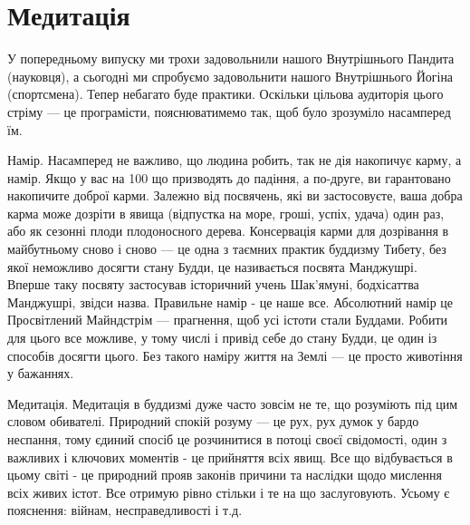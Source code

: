 \section{Медитація}

У попередньому випуску ми трохи задовольнили нашого Внутрішнього Пандита (науковця),
а сьогодні ми спробуємо задовольнити нашого Внутрішнього Йогіна (спортсмена).
Тепер небагато буде практики. Оскільки цільова аудиторія цього стріму ---
це програмісти, пояснюватимемо так, щоб було зрозуміло насамперед їм.

Намір. Насамперед не важливо, що людина робить, так не дія накопичує карму, а намір.
Якщо у вас на 100%
що призводять до падіння, а по-друге, ви гарантовано накопичите доброї карми.
Залежно від посвячень, які ви застосовуєте, ваша добра карма може дозріти в
явища (відпустка на море, гроші, успіх, удача) один раз, або як сезонні плоди
плодоносного дерева. Консервація карми для дозрівання в майбутньому сново і сново ---
це одна з таємних практик буддизму Тибету, без якої неможливо досягти стану Будди,
це називається посвята Манджушрі. Вперше таку посвяту застосував історичний учень
Шак'ямуні, бодхісаттва Манджушрі, звідси назва. Правильне намір - це наше все.
Абсолютний намір це Просвітлений Майндстрім --- прагнення, щоб усі істоти стали Буддами.
Робити для цього все можливе, у тому числі і привід себе до стану Будди, це один із
способів досягти цього. Без такого наміру життя на Землі --- це просто животіння у бажаннях.

Медитація. Медитація в буддизмі дуже часто зовсім не те, що розуміють під
цим словом обивателі. Природний спокій розуму --- це рух, рух думок у бардо
неспання, тому єдиний спосіб це розчинитися в потоці своєї свідомості, один
з важливих і ключових моментів - це прийняття всіх явищ. Все що відбувається
в цьому світі - це природний прояв законів причини та наслідки щодо мислення
всіх живих істот. Все отримую рівно стільки і те на що заслуговують.
Усьому є пояснення: війнам, несправедливості і т.д.


